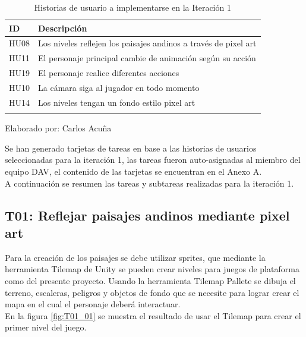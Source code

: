 \documentclass[a4paper, openright, 12pt]{report}
\begin{document}
\begin{longtable}{| l | p{5cm} |}
\hline
\captionsetup{justification=centering,margin=2cm}
\textbf{ID} & \textbf{Descripción} \\ \hline
HU08 &
Los niveles reflejen los paisajes andinos a través de pixel art \\ \hline
HU11 &
El personaje principal cambie de animación según su acción \\ \hline
HU19 &
El personaje realice diferentes acciones  \\ \hline
HU10 &
La cámara siga al jugador en todo momento \\ \hline
HU14 &
Los niveles tengan un fondo estilo pixel art \\ \hline 

\caption{Historias de usuario a implementarse en la Iteración 1}
\end{longtable}

\begin{center}
Elaborado por: Carlos Acuña
\end{center}

\justify
Se han generado tarjetas de tareas en base a las historias de usuarios seleccionadas para la iteración 1, las tareas fueron auto-asignadas al miembro del equipo DAV, el contenido de las tarjetas se encuentran en el Anexo A.\\
A continuación se resumen las tareas y subtareas realizadas para la iteración 1.

\subsection*{T01: Reflejar paisajes andinos mediante pixel art}
\justify
Para la creación de los paisajes se debe utilizar sprites, que mediante la herramienta Tilemap de Unity se pueden crear niveles para juegos de plataforma como del presente proyecto. Usando la herramienta Tilemap Pallete se dibuja el terreno, escaleras, peligros y objetos de fondo que se necesite para lograr crear el mapa en el cual el personaje deberá interactuar.\\
En la figura \ref{fig:T01_01} se muestra el resultado de usar el Tilemap para crear el primer nivel del juego.
   
\end{document}
